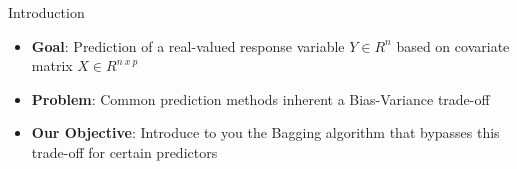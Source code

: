 \documentclass{beamer}
\begin{document}










\begin{frame}{Introduction}
\begin{itemize}
\item \textbf{Goal}: Prediction of a real-valued response variable $Y\in R^{n}$ based on covariate matrix $X\in R^{n\:x\:p}$
\item \textbf{Problem}: Common prediction methods inherent a Bias-Variance trade-off
%
%
%
\item \textbf{Our Objective}: Introduce to you the Bagging algorithm that bypasses this trade-off for certain predictors
%
%
\end{itemize}
\end{frame}
\end{document}
